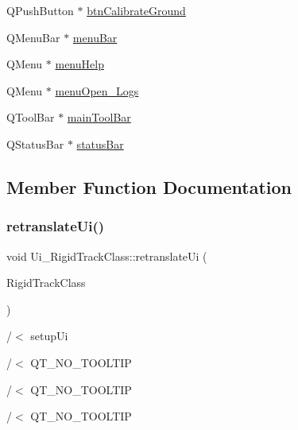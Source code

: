 \begin{DoxyCompactItemize}
\item 
Q\+Push\+Button $\ast$ \hyperlink{class_ui___rigid_track_class_a7497d27bfd5a03243079fdb055291264}{btn\+Calibrate\+Ground}
\item 
Q\+Menu\+Bar $\ast$ \hyperlink{class_ui___rigid_track_class_ae5991e1872fe74ac542cf0fdca8d4d0e}{menu\+Bar}
\item 
Q\+Menu $\ast$ \hyperlink{class_ui___rigid_track_class_a2df43c6bb7db7e366a64bc8dbbbab7cc}{menu\+Help}
\item 
Q\+Menu $\ast$ \hyperlink{class_ui___rigid_track_class_a1df91ff9df043558cf6d3c1dd6557250}{menu\+Open\+\_\+\+Logs}
\item 
Q\+Tool\+Bar $\ast$ \hyperlink{class_ui___rigid_track_class_abb7105788d67491618ebd4229964f992}{main\+Tool\+Bar}
\item 
Q\+Status\+Bar $\ast$ \hyperlink{class_ui___rigid_track_class_ac1ced4ae725bc0095307704d5d4fc4f2}{status\+Bar}
\end{DoxyCompactItemize}


\subsection{Member Function Documentation}
\mbox{\label{class_ui___rigid_track_class_a7c96951c4e173848e7695d6bd7883af6}} 
\subsubsection{\texorpdfstring{retranslate\+Ui()}{retranslateUi()}}
{\footnotesize\ttfamily void Ui\+\_\+\+Rigid\+Track\+Class\+::retranslate\+Ui (\begin{DoxyParamCaption}\item[{Q\+Main\+Window $\ast$}]{Rigid\+Track\+Class }\end{DoxyParamCaption})\hspace{0.3cm}{\ttfamily [inline]}}



/$<$ setup\+Ui 

/$<$ Q\+T\+\_\+\+N\+O\+\_\+\+T\+O\+O\+L\+T\+IP

/$<$ Q\+T\+\_\+\+N\+O\+\_\+\+T\+O\+O\+L\+T\+IP

/$<$ Q\+T\+\_\+\+N\+O\+\_\+\+T\+O\+O\+L\+T\+IP

